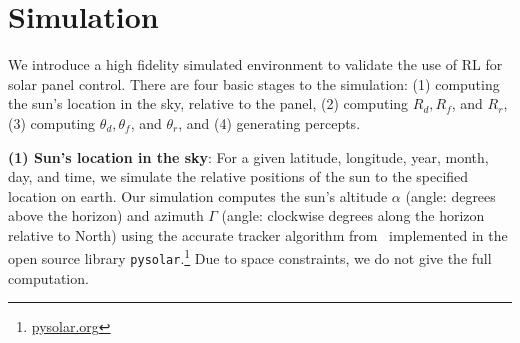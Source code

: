 \documentclass{article}
\begin{document}
%

\section{Simulation}
\label{sec:simulation}

We introduce a high fidelity simulated environment to validate the use of RL for solar panel control. There are four basic stages to the simulation: (1) computing the sun's location in the sky, relative to the panel, (2) computing $R_d, R_f$, and $R_r$, (3) computing $\theta_d, \theta_f$, and $\theta_r$, and (4) generating percepts.

{\bf (1) Sun's location in the sky}: For a given latitude, longitude, year, month, day, and time, we simulate the relative positions of the sun to the specified location on earth. Our simulation computes the sun's altitude $\alpha$ (angle: degrees above the horizon) and azimuth $\Gamma$ (angle: clockwise degrees along the horizon relative to North) using the accurate tracker algorithm from~\citet{reda2004solar} implemented in the open source library \texttt{pysolar}.\footnote{\url{pysolar.org}} Due to space constraints, we do not give the full computation. %
\end{document}
